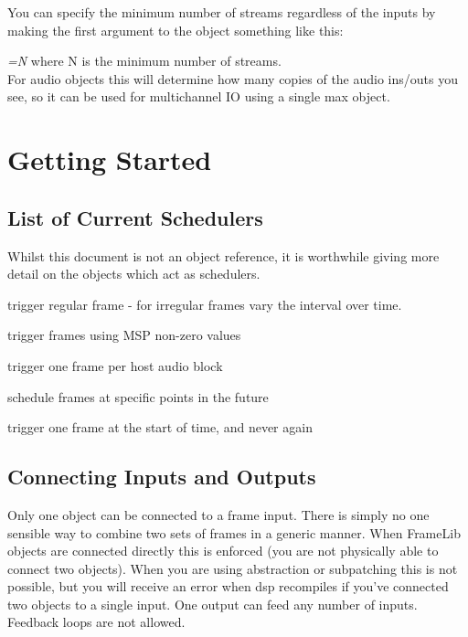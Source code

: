 \documentclass{article}
\newcommand{\flobject}[1]{\textit{fl.#1$\sim$}}
\begin{document}
You can specify the minimum number of streams regardless of the inputs by making the first argument to the object something like this:

\-\hspace{4ex} \textit{=N} where N is the minimum number of streams.\\ 
For audio objects this will determine how many copies of the audio ins/outs you see, so it can be used for multichannel IO using a single max object.
\pagebreak

\section{Getting Started}
\vspace{0.1in}

\subsection{List of Current Schedulers}

Whilst this document is not an object reference, it is worthwhile giving more detail on the objects which act as schedulers.

\begin{description}[align=left, itemindent=3cm, labelwidth=3cm]
\item [\flobject{interval}] trigger regular frame - for irregular frames vary the interval over time.
\item [\flobject{audiotrigger}] trigger frames using MSP non-zero values
\item [\flobject{perblock}] trigger one frame per host audio block
\item [\flobject{future}] schedule frames at specific points in the future
\item [\flobject{once}] trigger one frame at the start of time, and never again
\end{description}

\subsection{Connecting Inputs and Outputs}

Only one object can be connected to a frame input. There is simply no one sensible way to combine two sets of frames in a generic manner.  When FrameLib objects are connected directly this is enforced (you are not physically able to connect two objects). When you are using abstraction or subpatching this is not possible, but you will receive an error when dsp recompiles if you've connected two objects to a single input. One output can feed any number of inputs. Feedback loops are not allowed.
\end{document}
